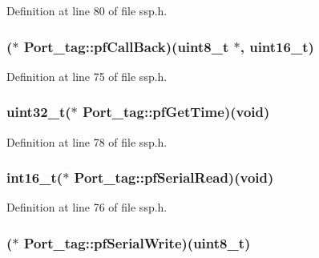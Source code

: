 Definition at line 80 of file ssp.\-h.

\hypertarget{struct_port__tag_a76f9abf9220f4cd3949dabe2bdf087c9}{
\subsubsection[{pf\-Call\-Back}]{($\ast$ Port\-\_\-tag\-::pf\-Call\-Back)(uint8\-\_\-t $\ast$, uint16\-\_\-t)}}\label{struct_port__tag_a76f9abf9220f4cd3949dabe2bdf087c9}


Definition at line 75 of file ssp.\-h.

\hypertarget{struct_port__tag_ad20edc7518658654c85bc8580bb0e72d}{
\subsubsection[{pf\-Get\-Time}]{\setlength{\rightskip}{0pt plus 5cm}uint32\-\_\-t($\ast$ Port\-\_\-tag\-::pf\-Get\-Time)({\bf void})}}\label{struct_port__tag_ad20edc7518658654c85bc8580bb0e72d}


Definition at line 78 of file ssp.\-h.

\hypertarget{struct_port__tag_a22effbba9213e57ac4ab1006a7474bc3}{
\subsubsection[{pf\-Serial\-Read}]{\setlength{\rightskip}{0pt plus 5cm}int16\-\_\-t($\ast$ Port\-\_\-tag\-::pf\-Serial\-Read)({\bf void})}}\label{struct_port__tag_a22effbba9213e57ac4ab1006a7474bc3}


Definition at line 76 of file ssp.\-h.

\hypertarget{struct_port__tag_a046a534a56d0809f721a001cd0aeac8a}{
\subsubsection[{pf\-Serial\-Write}]{($\ast$ Port\-\_\-tag\-::pf\-Serial\-Write)(uint8\-\_\-t)}}\label{struct_port__tag_a046a534a56d0809f721a001cd0aeac8a}


